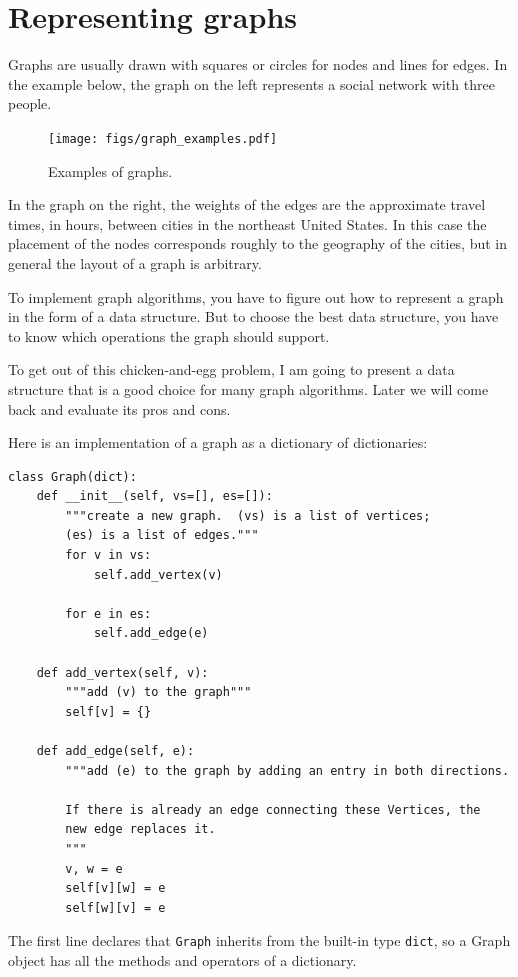 \documentclass[10pt]{book}
\begin{document}
\section{Representing graphs}
\label{graph.py}

Graphs are usually drawn with squares or circles for nodes and lines
for edges.  In the example below, the graph on the left represents
a social network with three people.


\begin{figure}
\centerline{\texttt{[image: figs/graph\_examples.pdf]}}
\caption{Examples of graphs.}
\end{figure}

In the graph on the right, the weights of the edges are the
approximate travel times, in hours, between cities in the northeast
United States.  In this case the placement of the nodes corresponds
roughly to the geography of the cities, but in general the layout
of a graph is arbitrary.

To implement graph algorithms, you have to figure
out how to represent a graph in the form of a data structure.
But to choose the best data structure, you have to know which
operations the graph should support.

To get out of this chicken-and-egg problem, I am going to present
a data structure that is a good choice for many graph algorithms.
Later we will come back and evaluate its pros and cons.

Here is an implementation of a graph as a dictionary of dictionaries:
%
\begin{verbatim}
class Graph(dict):
    def __init__(self, vs=[], es=[]):
        """create a new graph.  (vs) is a list of vertices;
        (es) is a list of edges."""
        for v in vs:
            self.add_vertex(v)

        for e in es:
            self.add_edge(e)

    def add_vertex(self, v):
        """add (v) to the graph"""
        self[v] = {}

    def add_edge(self, e):
        """add (e) to the graph by adding an entry in both directions.

        If there is already an edge connecting these Vertices, the
        new edge replaces it.
        """
        v, w = e
        self[v][w] = e
        self[w][v] = e
\end{verbatim}
%
The first line declares that {\tt Graph} inherits from the built-in
type {\tt dict}, so a Graph object has all the methods and operators
of a dictionary.
\end{document}
